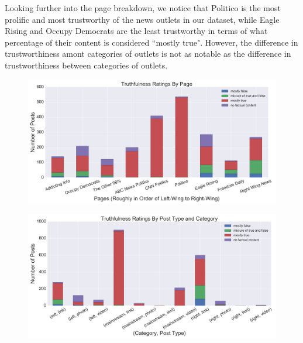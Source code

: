 \documentclass[12pt]{article}
\begin{document}
Looking further into the page breakdown, we notice that Politico is the most prolific and most trustworthy of the news outlets in our dataset, while Eagle Rising and Occupy Democrats are the least trustworthy in terms of what percentage of their content is considered ``mostly true". However, the difference in trustworthiness amont categories of outlets is not as notable as the difference in trustworthiness between categories of outlets.

\begin{figure}[H] 
    \centering
    \includegraphics[width=\textwidth]{ratings_distribution_by_page.png}
\end{figure}

\begin{figure}[H] 
    \centering
    \includegraphics[width=\textwidth]{ratings_distribution_by_category_type.png}
\end{figure}
\end{document}
